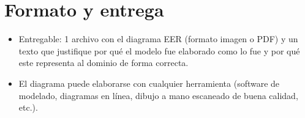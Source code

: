 \documentclass[12pt]{article}
\begin{document}
	\section*{Formato y entrega}
	
	\begin{itemize}
		\item Entregable: 1 archivo con el diagrama EER (formato imagen o PDF) y un texto que justifique por qué el modelo fue elaborado como lo fue y por qué este representa al dominio de forma correcta.
		\item El diagrama puede elaborarse con cualquier herramienta (software de modelado, diagramas en línea, dibujo a mano escaneado de buena calidad, etc.).
	\end{itemize}
	
\end{document}
